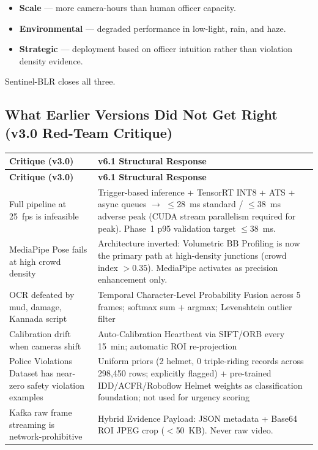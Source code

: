 \documentclass[11pt,a4paper]{article}
\begin{document}
\begin{itemize}[leftmargin=1.8em, itemsep=0.2em]
    \item \textbf{Scale} — more camera-hours than human officer capacity.
    \item \textbf{Environmental} — degraded performance in low-light, rain, and haze.
    \item \textbf{Strategic} — deployment based on officer intuition rather than violation density evidence.
\end{itemize}

Sentinel-BLR closes all three.

\subsection*{What Earlier Versions Did Not Get Right (v3.0 Red-Team Critique)}

\begin{longtable}{L{6cm} L{9cm}}
    \toprule
    \color{white}\textbf{Critique (v3.0)} & \color{white}\textbf{v6.1 Structural Response} \\
    \midrule
    \endfirsthead
    \toprule
    \color{white}\textbf{Critique (v3.0)} & \color{white}\textbf{v6.1 Structural Response} \\
    \midrule
    \endhead
    \bottomrule
    \endfoot

    Full pipeline at 25~fps is infeasible & Trigger-based inference + TensorRT INT8 + ATS + async queues $\rightarrow$ $\leq$28~ms standard / $\leq$38~ms adverse peak (CUDA stream parallelism required for peak). Phase~1 p95 validation target $\leq 38$~ms. \\
    MediaPipe Pose fails at high crowd density & Architecture inverted: Volumetric BB Profiling is now the primary path at high-density junctions (crowd index $> 0.35$). MediaPipe activates as precision enhancement only. \\
    OCR defeated by mud, damage, Kannada script & Temporal Character-Level Probability Fusion across 5 frames; softmax sum + argmax; Levenshtein outlier filter \\
    Calibration drift when cameras shift & Auto-Calibration Heartbeat via SIFT/ORB every 15~min; automatic ROI re-projection \\
    Police Violations Dataset has near-zero safety violation examples & Uniform priors (2 helmet, 0 triple-riding records across 298,450 rows; explicitly flagged) + pre-trained IDD/ACFR/Roboflow Helmet weights as classification foundation; not used for urgency scoring \\
    Kafka raw frame streaming is network-prohibitive & Hybrid Evidence Payload: JSON metadata + Base64 ROI JPEG crop ($<$50~KB). Never raw video. \\
\end{longtable}
\end{document}
